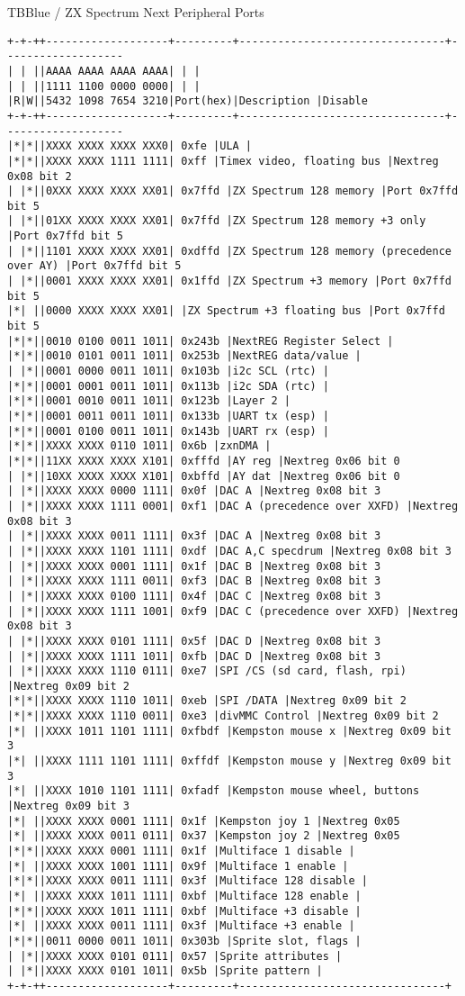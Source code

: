 TBBlue / ZX Spectrum Next Peripheral Ports
\begin{verbatim}
+-+-++-------------------+---------+--------------------------------+-------------------
| | ||AAAA AAAA AAAA AAAA| | |
| | ||1111 1100 0000 0000| | |
|R|W||5432 1098 7654 3210|Port(hex)|Description |Disable
+-+-++-------------------+---------+--------------------------------+-------------------
|*|*||XXXX XXXX XXXX XXX0| 0xfe |ULA |
|*|*||XXXX XXXX 1111 1111| 0xff |Timex video, floating bus |Nextreg 0x08 bit 2
| |*||0XXX XXXX XXXX XX01| 0x7ffd |ZX Spectrum 128 memory |Port 0x7ffd bit 5
| |*||01XX XXXX XXXX XX01| 0x7ffd |ZX Spectrum 128 memory +3 only |Port 0x7ffd bit 5
| |*||1101 XXXX XXXX XX01| 0xdffd |ZX Spectrum 128 memory (precedence over AY) |Port 0x7ffd bit 5
| |*||0001 XXXX XXXX XX01| 0x1ffd |ZX Spectrum +3 memory |Port 0x7ffd bit 5
|*| ||0000 XXXX XXXX XX01| |ZX Spectrum +3 floating bus |Port 0x7ffd bit 5
|*|*||0010 0100 0011 1011| 0x243b |NextREG Register Select |
|*|*||0010 0101 0011 1011| 0x253b |NextREG data/value |
| |*||0001 0000 0011 1011| 0x103b |i2c SCL (rtc) |
|*|*||0001 0001 0011 1011| 0x113b |i2c SDA (rtc) |
|*|*||0001 0010 0011 1011| 0x123b |Layer 2 |
|*|*||0001 0011 0011 1011| 0x133b |UART tx (esp) |
|*|*||0001 0100 0011 1011| 0x143b |UART rx (esp) |
|*|*||XXXX XXXX 0110 1011| 0x6b |zxnDMA |
|*|*||11XX XXXX XXXX X101| 0xfffd |AY reg |Nextreg 0x06 bit 0
| |*||10XX XXXX XXXX X101| 0xbffd |AY dat |Nextreg 0x06 bit 0
| |*||XXXX XXXX 0000 1111| 0x0f |DAC A |Nextreg 0x08 bit 3
| |*||XXXX XXXX 1111 0001| 0xf1 |DAC A (precedence over XXFD) |Nextreg 0x08 bit 3
| |*||XXXX XXXX 0011 1111| 0x3f |DAC A |Nextreg 0x08 bit 3
| |*||XXXX XXXX 1101 1111| 0xdf |DAC A,C specdrum |Nextreg 0x08 bit 3
| |*||XXXX XXXX 0001 1111| 0x1f |DAC B |Nextreg 0x08 bit 3
| |*||XXXX XXXX 1111 0011| 0xf3 |DAC B |Nextreg 0x08 bit 3
| |*||XXXX XXXX 0100 1111| 0x4f |DAC C |Nextreg 0x08 bit 3
| |*||XXXX XXXX 1111 1001| 0xf9 |DAC C (precedence over XXFD) |Nextreg 0x08 bit 3
| |*||XXXX XXXX 0101 1111| 0x5f |DAC D |Nextreg 0x08 bit 3
| |*||XXXX XXXX 1111 1011| 0xfb |DAC D |Nextreg 0x08 bit 3
| |*||XXXX XXXX 1110 0111| 0xe7 |SPI /CS (sd card, flash, rpi) |Nextreg 0x09 bit 2
|*|*||XXXX XXXX 1110 1011| 0xeb |SPI /DATA |Nextreg 0x09 bit 2
|*|*||XXXX XXXX 1110 0011| 0xe3 |divMMC Control |Nextreg 0x09 bit 2
|*| ||XXXX 1011 1101 1111| 0xfbdf |Kempston mouse x |Nextreg 0x09 bit 3
|*| ||XXXX 1111 1101 1111| 0xffdf |Kempston mouse y |Nextreg 0x09 bit 3
|*| ||XXXX 1010 1101 1111| 0xfadf |Kempston mouse wheel, buttons |Nextreg 0x09 bit 3
|*| ||XXXX XXXX 0001 1111| 0x1f |Kempston joy 1 |Nextreg 0x05
|*| ||XXXX XXXX 0011 0111| 0x37 |Kempston joy 2 |Nextreg 0x05
|*|*||XXXX XXXX 0001 1111| 0x1f |Multiface 1 disable |
|*| ||XXXX XXXX 1001 1111| 0x9f |Multiface 1 enable |
|*|*||XXXX XXXX 0011 1111| 0x3f |Multiface 128 disable |
|*| ||XXXX XXXX 1011 1111| 0xbf |Multiface 128 enable |
|*|*||XXXX XXXX 1011 1111| 0xbf |Multiface +3 disable |
|*| ||XXXX XXXX 0011 1111| 0x3f |Multiface +3 enable |
|*|*||0011 0000 0011 1011| 0x303b |Sprite slot, flags |
| |*||XXXX XXXX 0101 0111| 0x57 |Sprite attributes |
| |*||XXXX XXXX 0101 1011| 0x5b |Sprite pattern |
+-+-++-------------------+---------+--------------------------------+
\end{verbatim}
